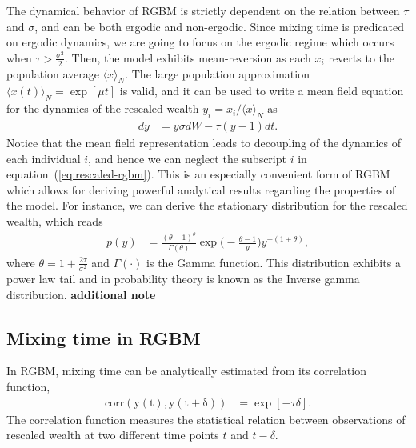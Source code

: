 \documentclass[11pt]{article}
\numberwithin{equation}{section}
\begin{document}
The dynamical behavior of RGBM is strictly dependent on the relation between $\tau$ and $\sigma$, and can be both ergodic and non-ergodic. Since mixing time is predicated on ergodic dynamics, we are going to focus on the ergodic regime which occurs when $\tau > \frac{\sigma^2}{2}$. Then, the model exhibits mean-reversion as each $x_i$ reverts to the population average $\langle x \rangle_N$. The large population approximation $\langle x(t) \rangle_N = \exp \left[\mu t\right]$ is valid, and it can be used to write a mean field equation for the dynamics of the rescaled wealth $y_i = x_i / \langle x \rangle_N$ as
\begin{align}
    d y &=   y \sigma d W - \tau (y - 1) dt.
    \label{eq:rescaled-rgbm}
\end{align}
Notice that the mean field representation leads to decoupling of the dynamics of each individual $i$, and hence we can neglect the subscript $i$ in equation~(\ref{eq:rescaled-rgbm}). This is an especially convenient form of RGBM which allows for deriving powerful analytical results regarding the properties of the model. For instance, we can derive  the stationary distribution for the rescaled wealth, which reads
\begin{align}
    p(y) &= \frac{(\theta - 1)^{\theta}}{\Gamma(\theta)} \exp{\big(-\frac{\theta - 1}{y}\big)} y^{-(1+\theta)},
    \label{eq:stationary-distributin}
\end{align}
where $\theta = 1 + \frac{2 \tau}{\sigma^2}$ and $\Gamma(\cdot)$ is the Gamma function.
This distribution exhibits a power law tail and in probability theory is known as the Inverse gamma distribution. \textbf{additional note}

\subsection{Mixing time in RGBM}

In RGBM, mixing time can be analytically estimated from its correlation function,
\begin{align}
    \mathrm{corr(y(t), y(t+\delta))} &= \exp\left[ -\tau \delta \right].
    \label{eq:rgbm-correlation}
\end{align}
The correlation function measures the statistical relation between observations of rescaled wealth at two different time points $t$ and $t-\delta$. 
\end{document}
